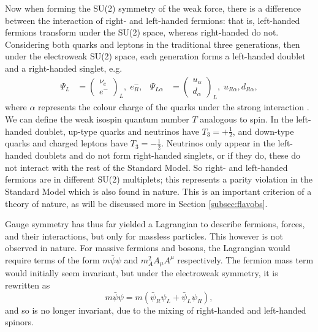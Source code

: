 \documentclass[a4paper,12pt]{article}
\begin{document}
Now when forming the SU(2) symmetry of the weak force, there is a difference between the interaction of right- and left-handed fermions: that is, left-handed fermions transform under the SU(2) space, whereas right-handed do not.
Considering both quarks and leptons in the traditional three generations, then under the electroweak SU(2) space, each generation forms a left-handed doublet and a right-handed singlet, e.g.
\begin{align}
    \label{eq:doublet}
    \Psi_L &=\begin{pmatrix} \nu_e \\ e^- \end{pmatrix}_L,\; e_R^-, & \Psi_{L\alpha} &=\begin{pmatrix} u_\alpha \\ d_\alpha\end{pmatrix}_L,\; u_{R\alpha},d_{R\alpha},
\end{align}
where $\alpha$ represents the colour charge of the quarks under the strong interaction \cite{schwartz}.
We can define the weak isospin quantum number $T$ analogous to spin. 
In the left-handed doublet, up-type quarks and neutrinos have $T_3=+\frac12$, and down-type quarks and charged leptons have $T_3=-\frac12$.
Neutrinos only appear in the left-handed doublets and do not form right-handed singlets, or if they do, these do not interact with the rest of the Standard Model.
So right- and left-handed fermions are in different SU(2) multiplets; this represents a parity violation in the Standard Model which is also found in nature. 
This is an important criterion of a theory of nature, as will be discussed more in Section \ref{subsec:flavobs}.

Gauge symmetry has thus far yielded a Lagrangian to describe fermions, forces, and their interactions, but only for massless particles. 
This however is not observed in nature. 
For massive fermions and bosons, the Lagrangian would require terms of the form $m\bar{\psi}\psi$ and $m_A^2A_\mu A^\mu$ respectively.
The fermion mass term would initially seem invariant, but under the electroweak symmetry, it is rewritten as
\begin{equation}
    \label{eq:mass}
    m\bar{\psi}\psi = m(\bar{\psi}_R\psi_L+\bar{\psi}_L\psi_R),
\end{equation}
and so is no longer invariant, due to the mixing of right-handed and left-handed spinors. 
\end{document}
